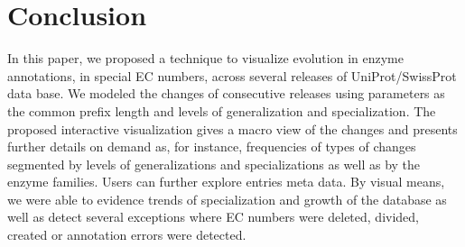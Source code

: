 \section{Conclusion}
\label{sec:conclusion}

In this paper, we proposed a technique to visualize evolution in enzyme annotations, in special EC numbers, across several releases of UniProt/SwissProt data base. We modeled the changes of consecutive releases using parameters as the common prefix length and levels of generalization and specialization. The proposed interactive visualization gives a macro view of the changes and presents further details on demand as, for instance, frequencies of types of changes segmented by levels of generalizations and specializations as well as by the enzyme families. Users can further explore entries meta data. By visual means, we were able to evidence trends of specialization and growth of the database as well as detect several exceptions where EC numbers were deleted, divided, created or annotation errors were detected.
